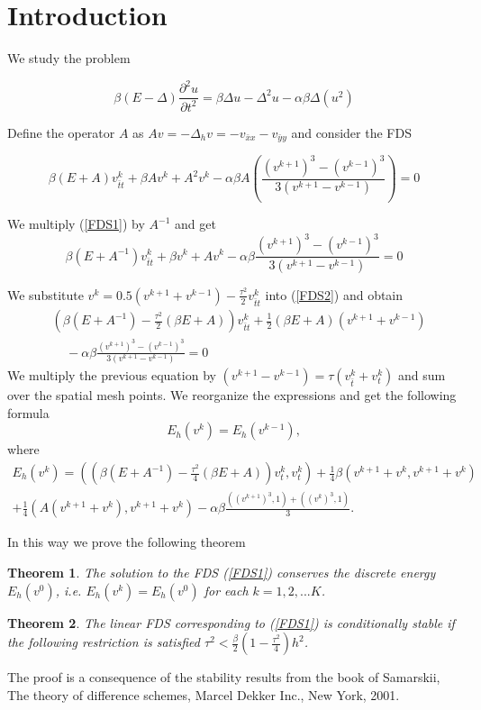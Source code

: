 \documentclass{article}
\newcommand{\be}{\begin{equation}}
\newcommand{\ee}{\end{equation}}
\newcommand{\rf}[1]{(\ref{#1})}
\newtheorem{thm}{Theorem}
\begin{document}
\section{Introduction}

We study the problem

\be\label{problem}
\beta(E-\Delta) \frac{\partial^2 u}{\partial t^2}=
 \beta \Delta u -\Delta^2 u -\alpha \beta \Delta (u^2)
\ee


Define the operator $A$ as $Av=-\Delta_h v=-v_{\bar{x}x} - v_{\bar{y}y}$ and consider the FDS

\be\label{FDS1}
\beta (E+A)v_{\bar{t}t}^k +\beta Av^k+A^2 v^k -\alpha \beta A\left(\frac{(v^{k+1})^3-(v^{k-1})^3}{3(v^{k+1}-v^{k-1})} \right)=0
\ee

We multiply \rf{FDS1} by $A^{-1}$ and get 
\be\label{FDS2}
\beta (E+A^{-1})v_{\bar{t}t}^k +\beta v^k+A v^k -\alpha \beta \frac{(v^{k+1})^3-(v^{k-1})^3}{3(v^{k+1}-v^{k-1})} =0
\ee

We substitute $v^{k}=0.5(v^{k+1}+v^{k-1})-\frac{\tau^2}{2}v_{\bar{t}t}^k$ into \rf{FDS2}
and obtain
\begin{align*}
&\left( \beta (E+A^{-1})- \frac{\tau^2}{2}(\beta E+A ) \right)v_{\bar{t}t}^k  + \frac{1}{2} (\beta E +A )(v^{k+1}+v^{k-1}) \\
&~~~~~-\alpha \beta \frac{(v^{k+1})^3-(v^{k-1})^3}{3(v^{k+1}-v^{k-1})} =0
\end{align*}
We multiply the previous equation by $(v^{k+1}-v^{k-1})=\tau (v_{\bar{t}}^k + v_{t}^k)$ and sum over the spatial mesh points.
We reorganize the expressions and get the following formula 
\be \label{num_en}
E_h(v^k) =E_h(v^{k-1}),
\ee
where
\begin{align*}
E_h(v^k)=\left( \left( \beta (E+A^{-1})- \frac{\tau^2}{4}(\beta E+A ) \right)v_{t}^k ,v_{t}^k \right)+\frac{1}{4} \beta \left(  v^{k+1}+v^{k}, v^{k+1}+v^{k} \right) \\
+\frac{1}{4}  \left(  A(v^{k+1}+v^{k}), v^{k+1}+v^{k} \right)
-\alpha \beta \frac{((v^{k+1})^3,1)+((v^{k})^3,1)}{3}.
\end{align*}

In this way we prove the following theorem
\begin{thm}
The solution to the FDS \rf{FDS1} conserves the discrete energy
 $E_h(v^0)$, i.e.  $E_h(v^k) =E_h(v^{0})$ for each $k=1,2,...K$.
\end{thm}

\begin{thm}
The linear FDS corresponding to \rf{FDS1} is conditionally stable if
the following restriction is satisfied
$\tau^2 < \frac{\beta}{2}(1-\frac{\tau^2}{4}) h^2$.

\end{thm}
The proof is a consequence of the stability results from the book of
 Samarskii,  The theory of difference schemes, Marcel Dekker Inc., New York, 2001.
\end{document}
